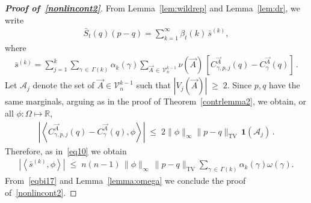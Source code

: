 \documentclass[10pt,a4paper]{article}
\renewcommand{\leq}{\;\leqslant\;}
\renewcommand{\geq}{\;\geqslant\;}
\newcommand{\tv}{\mathrm{TV}}
\newcommand{\ind}{\mathbf{1}}
\newcommand{\cA}{\mathcal{A}}
\newcommand{\cV}{\mathcal{V}}
\newcommand{\bbR}{\mathbb{R}}
\let\b=\beta
\let\g=\gamma
\let\o=\omega
\let\O=\Omega
\begin{document}
\begin{proof}[{\bf Proof of~\eqref{nonlincont2}}]
From Lemma~\ref{lem:wildrep} and Lemma~\ref{lem:dr}, we write
\begin{align}\label{eqbi17}
\bar S_t(q)(p-q) =\sum_{k=1}^\infty \b_t(k) \,\bar s^{(k)},
\end{align}
where
\begin{align}\label{eqbia17}
\bar s^{(k)}=\sum_{j=1}^k\sum_{\gamma\,\in\,\Gamma(k)}\alpha_k(\gamma)
\sum_{\vec A\,\in\,\cV_n^{k-1}}\nu(\vec A) \,\left[C^{\vec A}_{\gamma,p,j}(q)-C^{\vec A}_{\gamma}(q)\right]\,.
\end{align}
Let $\cA_{j}$ denote the set of $\vec A\in\cV_n^{k-1}$ such that $|V_j(\vec A)|\geq 2$. Since $p,q$ have the same marginals, arguing as in the proof of Theorem~\ref{contrlemma2}, we obtain, or all $\phi:\O\mapsto\bbR$,
\begin{align}\label{eqbas17}
\left|\left\langle C^{\vec A}_{\gamma,p,j}(q)-C^{\vec A}_{\gamma}(q), \phi\right\rangle\right|\leq 2\|\phi\|_\infty \|p-q\|_\tv\, \ind(\cA_j)\,.
\end{align}
Therefore, as in~\eqref{eq10} we obtain
\begin{align}\label{eqbas18}
\left|\left\langle \bar s^{(k)},\phi\right\rangle\right|\leq {n(n-1)}\,\|\phi\|_\infty\,\|p-q\|_\tv
\sum_{\gamma\,\in\,\Gamma(k)}\alpha_k(\gamma)
\o(\g).
\end{align}
From~\eqref{eqbi17} and Lemma~\ref{lemma:omega} we conclude the proof of~\eqref{nonlincont2}.
\end{proof}
\end{document}
